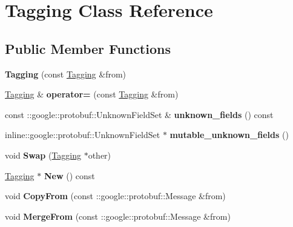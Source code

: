 \hypertarget{classTagging}{
\section{Tagging Class Reference}
\label{classTagging}
}
\subsection*{Public Member Functions}
\begin{DoxyCompactItemize}
\item 
\hypertarget{classTagging_a3236d0c0080d7f797f080151e66b756e}{
{\bfseries Tagging} (const \hyperlink{classTagging}{Tagging} \&from)}
\label{classTagging_a3236d0c0080d7f797f080151e66b756e}

\item 
\hypertarget{classTagging_ab21cdd0216e66fb17a8319c5f4b1a4d6}{
\hyperlink{classTagging}{Tagging} \& {\bfseries operator=} (const \hyperlink{classTagging}{Tagging} \&from)}
\label{classTagging_ab21cdd0216e66fb17a8319c5f4b1a4d6}

\item 
\hypertarget{classTagging_a1d1cc0a22c9a9f084b64f5fb6545390b}{
const ::google::protobuf::UnknownFieldSet \& {\bfseries unknown\_\-fields} () const }
\label{classTagging_a1d1cc0a22c9a9f084b64f5fb6545390b}

\item 
\hypertarget{classTagging_a91d117de804c4646ab9ea9d3103d40d9}{
inline::google::protobuf::UnknownFieldSet $\ast$ {\bfseries mutable\_\-unknown\_\-fields} ()}
\label{classTagging_a91d117de804c4646ab9ea9d3103d40d9}

\item 
\hypertarget{classTagging_a6b6767148366f94de9462d02171d19d0}{
void {\bfseries Swap} (\hyperlink{classTagging}{Tagging} $\ast$other)}
\label{classTagging_a6b6767148366f94de9462d02171d19d0}

\item 
\hypertarget{classTagging_a54c4069c679087287ca5926d05c9ec68}{
\hyperlink{classTagging}{Tagging} $\ast$ {\bfseries New} () const }
\label{classTagging_a54c4069c679087287ca5926d05c9ec68}

\item 
\hypertarget{classTagging_a337681fda513929c00d203798c04ad52}{
void {\bfseries CopyFrom} (const ::google::protobuf::Message \&from)}
\label{classTagging_a337681fda513929c00d203798c04ad52}

\item 
\hypertarget{classTagging_acaf751b83c2458013c2d12c4bdaea619}{
void {\bfseries MergeFrom} (const ::google::protobuf::Message \&from)}
\label{classTagging_acaf751b83c2458013c2d12c4bdaea619}


\end{DoxyCompactItemize}
